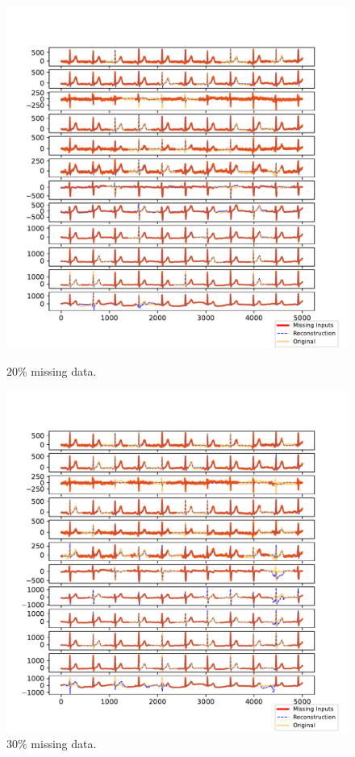 \documentclass{mldsmsc}
\begin{document}
\begin{figure}[H]
\centering
\begin{minipage}{0.3\linewidth}
    \centering
    \includegraphics[width=\linewidth]{images/missing/psmf_output_20_3.pdf}
    \caption{$20\%$ missing data.}
\end{minipage}%
\hspace{0.05\linewidth}
\begin{minipage}{0.3\linewidth}
    \centering
    \includegraphics[width=\linewidth]{images/missing/psmf_output_30_3.pdf}
    \caption{$30\%$ missing data.}
\end{minipage}


\end{figure}
\end{document}
